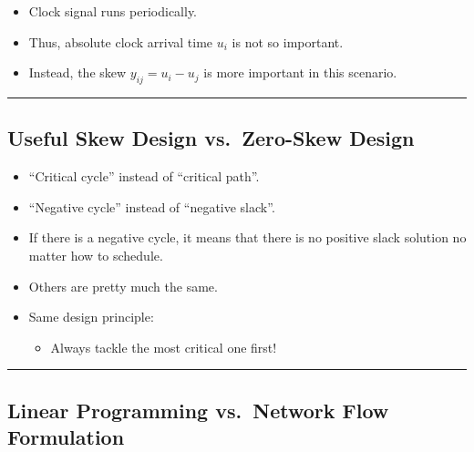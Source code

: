 \documentclass[
]{article}
\providecommand{\tightlist}{%
  \setlength{\itemsep}{0pt}\setlength{\parskip}{0pt}}
\begin{document}
\begin{itemize}
\item
  Clock signal runs periodically.
\item
  Thus, absolute clock arrival time \(u_i\) is not so important.
\item
  Instead, the skew \(y_{ij} = u_i - u_j\) is more important in this
  scenario.
\end{itemize}

\begin{center}\rule{0.5\linewidth}{0.5pt}\end{center}

\subsection{Useful Skew Design vs.~Zero-Skew Design}\label{useful-skew-design-vs.-zero-skew-design}

\begin{itemize}
\tightlist
\item
  ``Critical cycle'' instead of ``critical path''.
\item
  ``Negative cycle'' instead of ``negative slack''.
\item
  If there is a negative cycle, it means that there is no positive
  slack solution no matter how to schedule.
\item
  Others are pretty much the same.
\item
  Same design principle:

  \begin{itemize}
  \tightlist
  \item
    Always tackle the most critical one first!
  \end{itemize}
\end{itemize}

\begin{center}\rule{0.5\linewidth}{0.5pt}\end{center}

\subsection{Linear Programming vs.~Network Flow Formulation}\label{linear-programming-vs.-network-flow-formulation}
\end{document}
